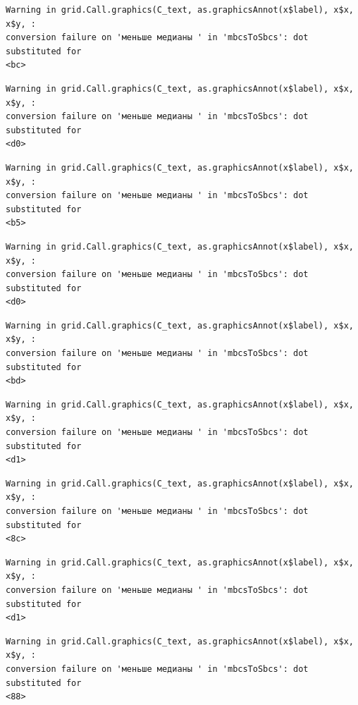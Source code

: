 \documentclass[
  letterpaper,
  DIV=11,
  numbers=noendperiod]{scrreprt}
\theoremstyle{definition}
\theoremstyle{remark}
\begin{document}
\begin{verbatim}
Warning in grid.Call.graphics(C_text, as.graphicsAnnot(x$label), x$x, x$y, :
conversion failure on 'меньше медианы ' in 'mbcsToSbcs': dot substituted for
<bc>
\end{verbatim}

\begin{verbatim}
Warning in grid.Call.graphics(C_text, as.graphicsAnnot(x$label), x$x, x$y, :
conversion failure on 'меньше медианы ' in 'mbcsToSbcs': dot substituted for
<d0>
\end{verbatim}

\begin{verbatim}
Warning in grid.Call.graphics(C_text, as.graphicsAnnot(x$label), x$x, x$y, :
conversion failure on 'меньше медианы ' in 'mbcsToSbcs': dot substituted for
<b5>
\end{verbatim}

\begin{verbatim}
Warning in grid.Call.graphics(C_text, as.graphicsAnnot(x$label), x$x, x$y, :
conversion failure on 'меньше медианы ' in 'mbcsToSbcs': dot substituted for
<d0>
\end{verbatim}

\begin{verbatim}
Warning in grid.Call.graphics(C_text, as.graphicsAnnot(x$label), x$x, x$y, :
conversion failure on 'меньше медианы ' in 'mbcsToSbcs': dot substituted for
<bd>
\end{verbatim}

\begin{verbatim}
Warning in grid.Call.graphics(C_text, as.graphicsAnnot(x$label), x$x, x$y, :
conversion failure on 'меньше медианы ' in 'mbcsToSbcs': dot substituted for
<d1>
\end{verbatim}

\begin{verbatim}
Warning in grid.Call.graphics(C_text, as.graphicsAnnot(x$label), x$x, x$y, :
conversion failure on 'меньше медианы ' in 'mbcsToSbcs': dot substituted for
<8c>
\end{verbatim}

\begin{verbatim}
Warning in grid.Call.graphics(C_text, as.graphicsAnnot(x$label), x$x, x$y, :
conversion failure on 'меньше медианы ' in 'mbcsToSbcs': dot substituted for
<d1>
\end{verbatim}

\begin{verbatim}
Warning in grid.Call.graphics(C_text, as.graphicsAnnot(x$label), x$x, x$y, :
conversion failure on 'меньше медианы ' in 'mbcsToSbcs': dot substituted for
<88>
\end{verbatim}
\end{document}
